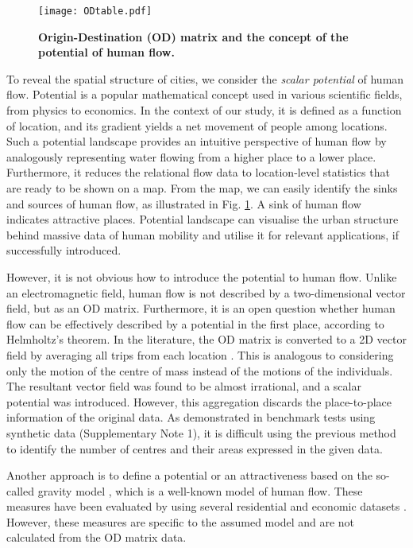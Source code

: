\documentclass[]{article}
\begin{document}
%
%
%
%
%
%
%
%
%
\begin{figure}[tbp]
  \centering
  \texttt{[image: ODtable.pdf]}
  \caption{\textbf{Origin-Destination (OD) matrix and the concept of the potential of human flow.}}
  \label{fig:odtable}
\end{figure}

%

To reveal the spatial structure of cities, 
we consider the {\it scalar potential} of human flow.
Potential is a popular mathematical concept used in various scientific fields, from physics to economics.
In the context of our study, it is defined as a function of location, and its gradient yields a net movement of people among locations.
Such a potential landscape provides an intuitive perspective of human flow by analogously representing water flowing from a higher place to a lower place.
Furthermore, it reduces the relational flow data to location-level statistics that are ready to be shown on a map.
From the map, we can easily identify the sinks and sources of human flow, as illustrated in Fig. \ref{fig:odtable}. 
A sink of human flow indicates attractive places. 
Potential landscape can visualise the urban structure behind massive data of human mobility
and utilise it for relevant applications, if successfully introduced.



%
%
%

%


%
However, it is not obvious how to introduce the potential to human flow.
Unlike an electromagnetic field,
human flow is not described by a two-dimensional vector field, but as an OD matrix.
Furthermore, it is an open question whether human flow can be effectively described by a potential in the first place, according to Helmholtz's theorem.
In the literature, 
the OD matrix is converted to a 2D vector field by averaging all trips from each location \cite{Mazzoli2019b}.
This is analogous to considering only the motion of the centre of mass instead of the motions of the individuals.
The resultant vector field was found to be almost irrational, and a scalar potential was introduced.
However, this aggregation discards the place-to-place information of the original data.
As demonstrated in benchmark tests using synthetic data (Supplementary Note 1),
it is difficult using the previous method to identify the number of centres and their areas expressed in the given data.
%

Another approach is to define a potential \cite{Stewart1947} or an attractiveness \cite{HarrisWilson1978} based on the so-called gravity model \cite{gravity_zipf1946,Ullman1956,WilsonBook1974}, which is a well-known model of human flow.
These measures have been evaluated by using several residential and economic datasets \cite{Geurs2004,Ellam2018}.
%
However, these measures are specific to the assumed model and are not calculated from the OD matrix data.
%
\end{document}
